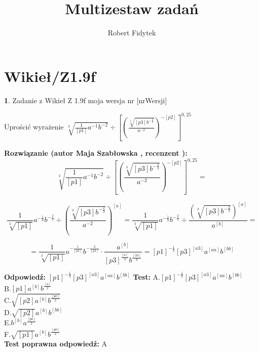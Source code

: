 \documentclass[12pt, a4paper]{article}
\title{Multizestaw zadań}
\author{Robert Fidytek}
\date{}
\theoremstyle{definition} %
\newtheorem{zad}{}
\newcommand{\kategoria}[1]{\section{#1}} %
\newcommand{\zadStart}[1]{\begin{zad}#1\newline} %
\newcommand{\zadStop}{\end{zad}}   %
\newcommand{\rozwStart}[2]{\noindent \textbf{Rozwiązanie (autor #1 , recenzent #2): }\newline} %
\newcommand{\rozwStop}{\newline}                                            %
\newcommand{\odpStart}{\noindent \textbf{Odpowiedź:}\newline}    %
\newcommand{\odpStop}{\newline}                                             %
\newcommand{\testStart}{\noindent \textbf{Test:}\newline} %
\newcommand{\testStop}{\newline} %
\newcommand{\kluczStart}{\noindent \textbf{Test poprawna odpowiedź:}\newline} %
\newcommand{\kluczStop}{\newline} %
\begin{document}
\maketitle


\kategoria{Wikieł/Z1.9f}
\zadStart{Zadanie z Wikieł Z 1.9f moja wersja nr [nrWersji]}


Uprościć wyrażenie $\sqrt[3]{\frac{1}{[p1]}a^{-1}b^{-2}}\div\left[\left(\frac{\sqrt[3]{[p3]b^{-\frac{2}{3}}}}{a^{-2}}\right)^{-[p2]}\right]^{0,25}$

\zadStop

\rozwStart{Maja Szabłowska}{}
$$\sqrt[3]{\frac{1}{[p1]}a^{-1}b^{-2}}\div\left[\left(\frac{\sqrt[3]{[p3]b^{-\frac{2}{3}}}}{a^{-2}}\right)^{-[p2]}\right]^{0,25}=$$

$$\frac{1}{\sqrt[3]{[p1]}}a^{-\frac{1}{3}}b^{-\frac{2}{3}}\div \left(\frac{\sqrt[3]{[p3]b^{-\frac{2}{3}}}}{a^{-2}}\right)^{[a]}=\frac{1}{\sqrt[3]{[p1]}}a^{-\frac{1}{3}}b^{-\frac{2}{3}}\div \frac{\left(\sqrt[3]{[p3]b^{-\frac{2}{3}}}\right)^{[a]}}{a^{[b]}}=$$

$$=\frac{1}{\sqrt[3]{[p1]}}a^{-\frac{1}{[p1]}}b^{-\frac{2}{[p1]}}\cdot\frac{a^{[b]}}{[p3]^{\frac{[a]}{3}}b^{\frac{[2a]}{9}}}=[p1]^{-\frac{1}{3}}[p3]^{[a3]}a^{[aa]}b^{[bb]}$$
\rozwStop


\odpStart
$[p1]^{-\frac{1}{3}}[p3]^{[a3]}a^{[aa]}b^{[bb]}$
\odpStop
\testStart
A.$[p1]^{-\frac{1}{3}}[p3]^{[a3]}a^{[aa]}b^{[bb]}$\\
B.$[p1]a^{[b]}b^{\frac{[a]}{2}}$\\
C.$\sqrt{[p2]a^{[b]}b^{\frac{[p0]}{2}}}$\\
D.$\sqrt{[p2]}a^{[b]}b^{[bb]}$\\
E.$b^{[b]}a^{\frac{[p0]}{2}}$\\
F.$\sqrt{[p1]}a^{[b]}b^{\frac{[p0]}{2}}$\\
\testStop
\kluczStart
A
\kluczStop
\end{document}
